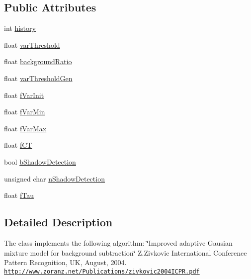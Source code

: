\subsection*{Public Attributes}
\begin{DoxyCompactItemize}
\item 
int \hyperlink{classcv_1_1gpu_1_1MOG2__GPU_a403f85c4f33fb111943daba58b0b21f0}{history}
\item 
float \hyperlink{classcv_1_1gpu_1_1MOG2__GPU_a19f742a3fa03f0d43e73a288b8cab65c}{var\-Threshold}
\item 
float \hyperlink{classcv_1_1gpu_1_1MOG2__GPU_ab646673e679c021d6971eeba1b44abfa}{background\-Ratio}
\item 
float \hyperlink{classcv_1_1gpu_1_1MOG2__GPU_a90ab8efe3e16585ecb93656d321fbebc}{var\-Threshold\-Gen}
\item 
float \hyperlink{classcv_1_1gpu_1_1MOG2__GPU_af6c5ff19e5ca4c4e80bdb330a40a9b0f}{f\-Var\-Init}
\item 
float \hyperlink{classcv_1_1gpu_1_1MOG2__GPU_a898eb021a33aeb3ba8883dd1e734dce0}{f\-Var\-Min}
\item 
float \hyperlink{classcv_1_1gpu_1_1MOG2__GPU_ad45804934365ec0dd8dc49f90b6ebce2}{f\-Var\-Max}
\item 
float \hyperlink{classcv_1_1gpu_1_1MOG2__GPU_a2dd28f1330681ced7f872e0ae8b3f0ef}{f\-C\-T}
\item 
bool \hyperlink{classcv_1_1gpu_1_1MOG2__GPU_ae7b0f3d5c29a710e4185ec1fb9335b96}{b\-Shadow\-Detection}
\item 
unsigned char \hyperlink{classcv_1_1gpu_1_1MOG2__GPU_aa78756f4db93b7c599a5830d3fc9592e}{n\-Shadow\-Detection}
\item 
float \hyperlink{classcv_1_1gpu_1_1MOG2__GPU_a0a1a2553c82bd821783e4840e4c9c6ee}{f\-Tau}
\end{DoxyCompactItemize}


\subsection{Detailed Description}
The class implements the following algorithm\-: \char`\"{}\-Improved adaptive Gausian mixture model for background subtraction\char`\"{} Z.\-Zivkovic International Conference Pattern Recognition, U\-K, August, 2004. \href{http://www.zoranz.net/Publications/zivkovic2004ICPR.pdf}{\tt http\-://www.\-zoranz.\-net/\-Publications/zivkovic2004\-I\-C\-P\-R.\-pdf} 

